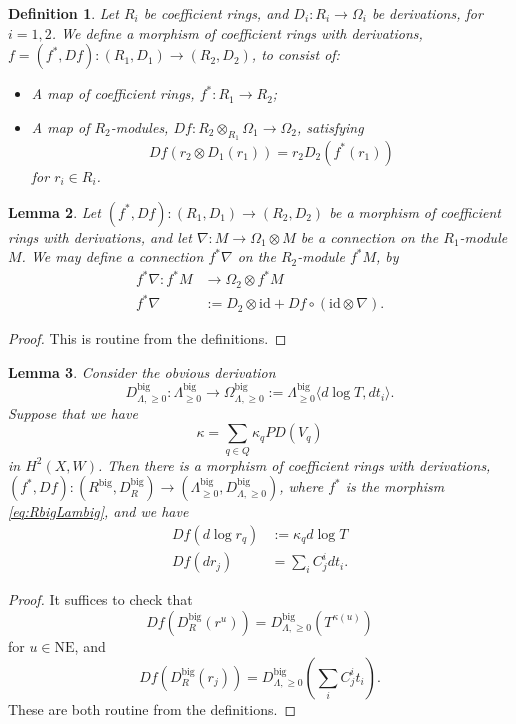 \documentclass{article}
\newtheorem{lem}{Lemma}[section]
\newtheorem{defn}[lem]{Definition}
\def\nov{r}
\def\NE{\mathrm{NE}}
\def\NE{\mathrm{NE}}
\def\id{\mathrm{id}}
\def\big{{\operatorname{big}}}
\def\novb{r}
\def\novblam{t}
\begin{document}
\begin{defn}
Let $R_i$ be coefficient rings, and $D_i:R_i \to \Omega_i$ be derivations, for $i=1,2$. 
We define a morphism of coefficient rings with derivations, $f = (f^*,Df): (R_1,D_1) \to (R_2,D_2)$, to consist of:
\begin{itemize}
    \item A map of coefficient rings, $f^*:R_1 \to R_2$;
    \item A map of $R_2$-modules, $Df:R_2 \otimes_{R_1} \Omega_1  \to \Omega_2$, satisfying
    $$Df (r_2 \otimes D_1(r_1)) = r_2 D_2(f^*(r_1))$$ 
    for $r_i \in R_i$.
\end{itemize} 
\end{defn}

\begin{lem}\label{lem:pullback conn}
    Let $(f^*,Df):(R_1,D_1) \to (R_2,D_2)$ be a morphism of coefficient rings with derivations, and let $\nabla:M \to \Omega_1 \otimes M$ be a connection on the $R_1$-module $M$. 
    We may define a connection $f^*\nabla$ on the $R_2$-module $f^*M$, by
    \begin{align*}
    f^* \nabla: f^*M  & \to \Omega_2 \otimes f^*M \\
    f^*\nabla & := D_2 \otimes \id + Df \circ (\id \otimes \nabla). 
\end{align*}
\end{lem}
\begin{proof}
    This is routine from the definitions.
\end{proof}

\begin{lem}\label{lem:RLamder}
Consider the obvious derivation
$$D^\big_{\Lambda,\ge 0}: \Lambda^\big_{\ge 0} \to \Omega^\big_{\Lambda,\ge 0}:= \Lambda^\big_{\ge 0} \langle d\log T, d\novblam_i \rangle.$$
Suppose that we have
$$\kappa = \sum_{q \in Q} \kappa_q PD(V_q)$$
in $H^2(X,W)$. 
Then there is a morphism of coefficient rings with derivations, $(f^*,Df):(R^\big,D^\big_R) \to (\Lambda^\big_{\ge 0},D^\big_{\Lambda,\ge 0})$, where $f^*$ is the morphism \eqref{eq:RbigLambig}, and we have
\begin{align*}
    Df(d\log \nov_q) &:= \kappa_q d\log T \\
    Df(d\novb_j) &= \sum_i C^i_j d\novblam_i. 
\end{align*}
\end{lem}
\begin{proof}
    It suffices to check that
    $$Df(D^\big_R(\nov^u)) = D^\big_{\Lambda,\ge 0}(T^{\kappa(u)})$$
    for $u \in \NE$, and
    $$Df(D^\big_R(\novb_j)) = D^\big_{\Lambda,\ge 0}(\sum_i C^i_j \novblam_i).$$
    These are both routine from the definitions.
\end{proof}
\end{document}
